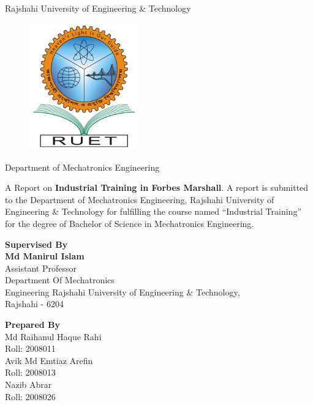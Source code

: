 \begin{center}
    Rajshahi University of Engineering \& Technology
\end{center}
\begin{figure}[h!]
    \centering
    \includegraphics[width=4.7cm]{figs/RUET.png}
    \label{fig:ruet1}
\end{figure}

\begin{center}
    Department of Mechatronics Engineering
\end{center}
\setlength{\columnsep}{0.1\textwidth}
\noindent A Report on \textbf{Industrial Training in Forbes Marshall}. A report is submitted to the Department of Mechatronics Engineering, Rajshahi University of Engineering \& Technology for fulfilling the course named “Industrial Training” for the degree of Bachelor of Science in Mechatronics Engineering.

\begin{center}
    \begin{multicols}{2}
        \noindent \textbf{Supervised By}\\
        \textbf{Md Manirul Islam}\\
        Assistant Professor\\
        \noindent Department Of Mechatronics\\
        Engineering
        \noindent Rajshahi University of Engineering \& Technology,\\
        Rajshahi - 6204
        \columnbreak

        \noindent \textbf{Prepared By}\\
        Md Raihanul Haque Rahi\\
        Roll: 2008011\\

        \noindent Avik Md Emtiaz Arefin\\
        Roll: 2008013\\

        \noindent Nazib Abrar\\
        Roll: 2008026\\


    \end{multicols}
\end{center}